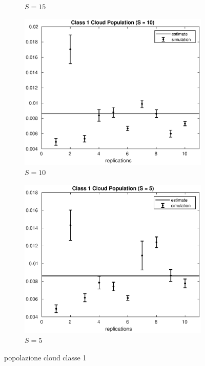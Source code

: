 \begin{figure}[!h]
\begin{subfigure}[t]{0.49\textwidth}
\caption{$S = 15$}
\label{15_n1cloud}
\end{subfigure}
%
\begin{subfigure}[t]{0.49\textwidth}
\includegraphics[width=\textwidth]{figures/simul/10_500K_n1cloud}
\caption{$S = 10$}
\label{10_n1cloud}
\end{subfigure}
%
\begin{subfigure}[t]{0.49\textwidth}
\includegraphics[width=\textwidth]{figures/simul/5_500K_n1cloud}
\caption{$S = 5$}
\label{5_n1cloud}
\end{subfigure}
%
\caption{popolazione cloud classe 1}
\label{plot:n1cloud}
\end{figure}
%
%

